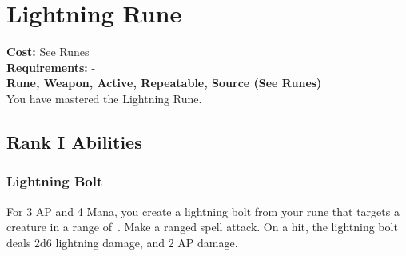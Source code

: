 \section{Lightning Rune}\label{rune:lightning}
\textbf{Cost:} See Runes\\
\textbf{Requirements:} -\\
\textbf{Rune, Weapon, Active, Repeatable, Source (See Runes)}\\
You have mastered the Lightning Rune.

\subsection{Rank I Abilities}

\subsubsection{Lightning Bolt}
For 3 AP and 4 Mana, you create a lightning bolt from your rune that targets a creature in a range of~.
Make a ranged spell attack.
On a hit, the lightning bolt deals 2d6 lightning damage, and 2 AP damage.